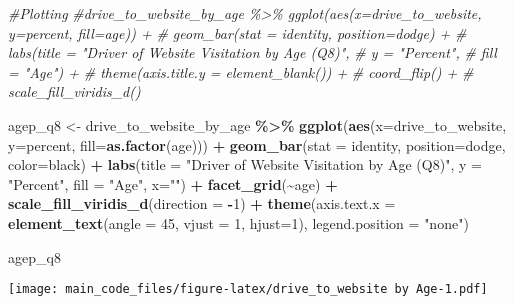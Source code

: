 \documentclass[
]{article}
\newenvironment{Shaded}{\begin{snugshade}}{\end{snugshade}}
\newcommand{\AttributeTok}[1]{\textcolor[rgb]{0.13,0.29,0.53}{#1}}
\newcommand{\CommentTok}[1]{\textcolor[rgb]{0.56,0.35,0.01}{\textit{#1}}}
\newcommand{\DecValTok}[1]{\textcolor[rgb]{0.00,0.00,0.81}{#1}}
\newcommand{\FunctionTok}[1]{\textcolor[rgb]{0.13,0.29,0.53}{\textbf{#1}}}
\newcommand{\NormalTok}[1]{#1}
\newcommand{\OtherTok}[1]{\textcolor[rgb]{0.56,0.35,0.01}{#1}}
\newcommand{\SpecialCharTok}[1]{\textcolor[rgb]{0.81,0.36,0.00}{\textbf{#1}}}
\newcommand{\StringTok}[1]{\textcolor[rgb]{0.31,0.60,0.02}{#1}}
\begin{document}
\begin{Shaded}
\begin{Highlighting}[]
\CommentTok{\#Plotting}
\CommentTok{\#drive\_to\_website\_by\_age \%\textgreater{}\% ggplot(aes(x=drive\_to\_website, y=percent, fill=age)) +}
\CommentTok{\#  geom\_bar(stat = \textquotesingle{}identity\textquotesingle{}, position=\textquotesingle{}dodge\textquotesingle{}) +}
\CommentTok{\#  labs(title = "Driver of Website Visitation by Age (Q8)",}
\CommentTok{\#       y = "Percent",}
\CommentTok{\#       fill = "Age") +}
\CommentTok{\#  theme(axis.title.y = element\_blank()) +}
\CommentTok{\#  coord\_flip() +}
\CommentTok{\#  scale\_fill\_viridis\_d()}

\NormalTok{agep\_q8 }\OtherTok{\textless{}{-}}\NormalTok{ drive\_to\_website\_by\_age }\SpecialCharTok{\%\textgreater{}\%} \FunctionTok{ggplot}\NormalTok{(}\FunctionTok{aes}\NormalTok{(}\AttributeTok{x=}\NormalTok{drive\_to\_website, }\AttributeTok{y=}\NormalTok{percent, }\AttributeTok{fill=}\FunctionTok{as.factor}\NormalTok{(age))) }\SpecialCharTok{+}
  \FunctionTok{geom\_bar}\NormalTok{(}\AttributeTok{stat =} \StringTok{\textquotesingle{}identity\textquotesingle{}}\NormalTok{, }\AttributeTok{position=}\StringTok{\textquotesingle{}dodge\textquotesingle{}}\NormalTok{, }\AttributeTok{color=}\StringTok{\textquotesingle{}black\textquotesingle{}}\NormalTok{) }\SpecialCharTok{+}
  \FunctionTok{labs}\NormalTok{(}\AttributeTok{title =} \StringTok{"Driver of Website Visitation by Age (Q8)"}\NormalTok{,}
       \AttributeTok{y =} \StringTok{"Percent"}\NormalTok{,}
       \AttributeTok{fill =} \StringTok{"Age"}\NormalTok{,}
       \AttributeTok{x=}\StringTok{""}\NormalTok{) }\SpecialCharTok{+}
  \FunctionTok{facet\_grid}\NormalTok{(}\SpecialCharTok{\textasciitilde{}}\NormalTok{age) }\SpecialCharTok{+}
  \FunctionTok{scale\_fill\_viridis\_d}\NormalTok{(}\AttributeTok{direction =} \SpecialCharTok{{-}}\DecValTok{1}\NormalTok{) }\SpecialCharTok{+}
  \FunctionTok{theme}\NormalTok{(}\AttributeTok{axis.text.x =} \FunctionTok{element\_text}\NormalTok{(}\AttributeTok{angle =} \DecValTok{45}\NormalTok{, }\AttributeTok{vjust =} \DecValTok{1}\NormalTok{, }\AttributeTok{hjust=}\DecValTok{1}\NormalTok{),}
        \AttributeTok{legend.position =} \StringTok{"none"}\NormalTok{) }

\NormalTok{agep\_q8}
\end{Highlighting}
\end{Shaded}

\texttt{[image: main\_code\_files/figure-latex/drive\_to\_website by Age-1.pdf]}
\end{document}
